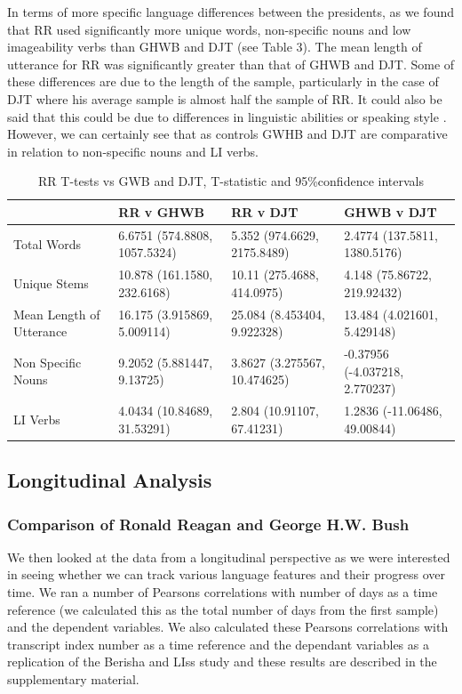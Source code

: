 \documentclass[12pt]{article}
\begin{document}
In terms of more specific language differences between the presidents, as we found that RR used significantly more unique words, non-specific nouns and low imageability verbs than GHWB and DJT (see Table 3). The mean length of utterance for RR was significantly greater than that of GHWB and DJT. Some of these differences are due to the length of the sample, particularly in the case of DJT where his average sample is almost half the sample of RR. It could also be said that this could be due to differences in linguistic abilities or speaking style \cite{Berisha2015, Le2011}. However, we can certainly see that as controls GWHB and DJT are comparative in relation to non-specific nouns and LI verbs. 

\begin{table}[H]
	\begin{center}
	\begin{tabular}{ | p{3cm} | p{2.2cm} | p{2.2cm} | p{2.2cm} |}
		\hline
		& RR v GHWB & RR v DJT & GHWB v DJT \\ \hline
		Total Words & 6.6751 (574.8808, 1057.5324) & 5.352 (974.6629, 2175.8489) & 2.4774 (137.5811, 1380.5176) \\ \hline
		Unique Stems & 10.878 (161.1580, 232.6168) & 10.11 (275.4688, 414.0975) & 4.148 (75.86722, 219.92432) \\ \hline
		Mean Length of Utterance & 16.175 (3.915869, 5.009114) & 25.084 (8.453404, 9.922328)  & 13.484 (4.021601, 5.429148) \\ \hline	
		Non Specific Nouns & 9.2052 (5.881447, 9.13725) & 3.8627 (3.275567, 10.474625) & -0.37956 (-4.037218, 2.770237) \\ \hline
		LI Verbs & 4.0434 (10.84689, 31.53291) & 2.804 (10.91107, 67.41231) & 1.2836 (-11.06486, 49.00844)\\ \hline
	\end{tabular}
	\caption{\label{tab:table-name}RR T-tests vs GWB and DJT, T-statistic and 95\%confidence intervals}
	\end{center} 
\end{table}

\subsection{Longitudinal Analysis}
\subsubsection{Comparison of Ronald Reagan and George H.W. Bush}
We then looked at the data from a longitudinal perspective as we were interested in seeing whether we can track various language features and their progress over time. We ran a number of Pearsons correlations with number of days as a time reference (we calculated this as the total number of days from the first sample) and the dependent variables. We also calculated these Pearsons correlations with transcript index number as a time reference and the dependant variables as a replication of the Berisha and LIss study \cite{Berisha2015} and these results are described in the supplementary material.
\end{document}
